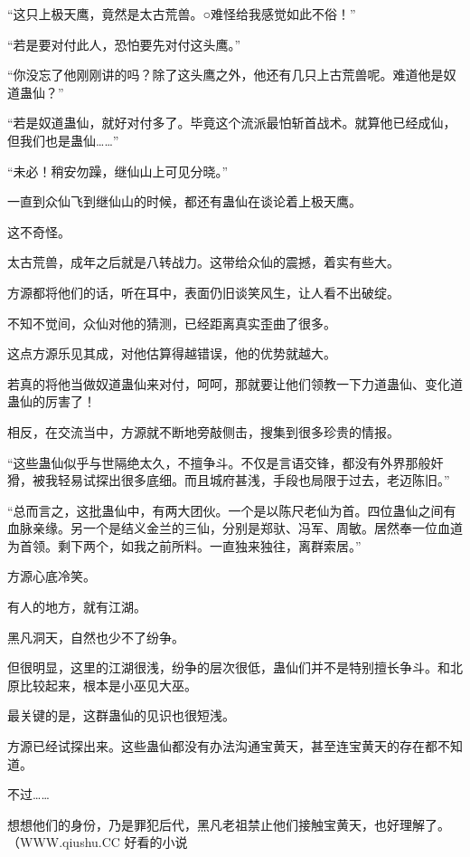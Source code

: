 
\begin{this_body}

“这只上极天鹰，竟然是太古荒兽。○难怪给我感觉如此不俗！”

“若是要对付此人，恐怕要先对付这头鹰。”

“你没忘了他刚刚讲的吗？除了这头鹰之外，他还有几只上古荒兽呢。难道他是奴道蛊仙？”

“若是奴道蛊仙，就好对付多了。毕竟这个流派最怕斩首战术。就算他已经成仙，但我们也是蛊仙……”

“未必！稍安勿躁，继仙山上可见分晓。”

一直到众仙飞到继仙山的时候，都还有蛊仙在谈论着上极天鹰。

这不奇怪。

太古荒兽，成年之后就是八转战力。这带给众仙的震撼，着实有些大。

方源都将他们的话，听在耳中，表面仍旧谈笑风生，让人看不出破绽。

不知不觉间，众仙对他的猜测，已经距离真实歪曲了很多。

这点方源乐见其成，对他估算得越错误，他的优势就越大。

若真的将他当做奴道蛊仙来对付，呵呵，那就要让他们领教一下力道蛊仙、变化道蛊仙的厉害了！

相反，在交流当中，方源就不断地旁敲侧击，搜集到很多珍贵的情报。

“这些蛊仙似乎与世隔绝太久，不擅争斗。不仅是言语交锋，都没有外界那般奸猾，被我轻易试探出很多底细。而且城府甚浅，手段也局限于过去，老迈陈旧。”

“总而言之，这批蛊仙中，有两大团伙。一个是以陈尺老仙为首。四位蛊仙之间有血脉亲缘。另一个是结义金兰的三仙，分别是郑驮、冯军、周敏。居然奉一位血道为首领。剩下两个，如我之前所料。一直独来独往，离群索居。”

方源心底冷笑。

有人的地方，就有江湖。

黑凡洞天，自然也少不了纷争。

但很明显，这里的江湖很浅，纷争的层次很低，蛊仙们并不是特别擅长争斗。和北原比较起来，根本是小巫见大巫。

最关键的是，这群蛊仙的见识也很短浅。

方源已经试探出来。这些蛊仙都没有办法沟通宝黄天，甚至连宝黄天的存在都不知道。

不过……

想想他们的身份，乃是罪犯后代，黑凡老祖禁止他们接触宝黄天，也好理解了。（WWW.qiushu.CC 好看的小说


\end{this_body}

